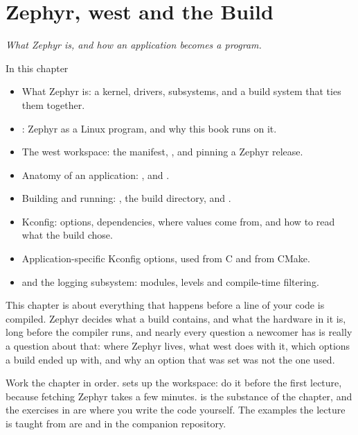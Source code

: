 
\chapter{Zephyr, west and the Build}
\label{c1:ch:build}\label{c1:ch}

{\large\itshape What Zephyr is, and how an application becomes a program.\par}

\begin{chapterbox}{In this chapter}
\begin{itemize}
  \item What Zephyr is: a kernel, drivers, subsystems, and a build system that ties them together.
  \item {}: Zephyr as a Linux program, and why this book runs on it.
  \item The west workspace: the manifest, , and pinning a Zephyr release.
  \item Anatomy of an application: ,  and .
  \item Building and running: , the build directory, and .
  \item Kconfig: options, dependencies, where values come from, and how to read what the build chose.
  \item Application-specific Kconfig options, used from C and from CMake.
  \item {} and the logging subsystem: modules, levels and compile-time filtering.
\end{itemize}
\end{chapterbox}

This chapter is about everything that happens before a line of your code is compiled. Zephyr decides
what a build contains, and what the hardware in it is, long before the compiler runs, and nearly
every question a newcomer has is really a question about that: where Zephyr lives, what west does
with it, which options a build ended up with, and why an option that was set was not the one used.

Work the chapter in order.  sets up the workspace: do it before the first lecture,
because fetching Zephyr takes a few minutes.  is the substance of the chapter, and
the exercises in  are where you write the code yourself. The examples the
lecture is taught from are  and
 in the companion repository.





